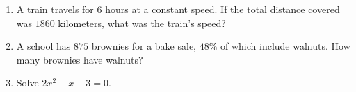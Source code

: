 \documentclass{article}
\begin{document}
\begin{enumerate}

\item A train travels for $6$ hours at a constant speed. If the total distance covered was $1860$ kilometers, what was the train's speed?

        \begin{enumerate}
        \end{enumerate}


\item A school has $875$ brownies for a bake sale, $48\%$ of which include walnuts. How many brownies have walnuts?

        \begin{enumerate}
        \end{enumerate}



\item Solve $2x^2-x-3=0$.

        \begin{enumerate}
        \end{enumerate}



 
  

\end{enumerate}
\end{document}
